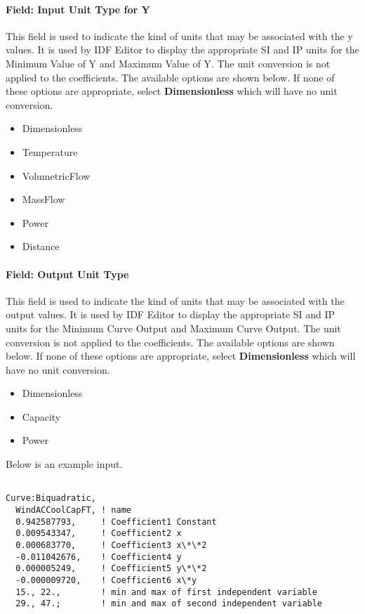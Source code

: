 \paragraph{Field: Input Unit Type for Y}\label{field-input-unit-type-for-y-2}

This field is used to indicate the kind of units that may be associated with the y values. It is used by IDF Editor to display the appropriate SI and IP units for the Minimum Value of Y and Maximum Value of Y. The unit conversion is not applied to the coefficients. The available options are shown below. If none of these options are appropriate, select \textbf{Dimensionless} which will have no unit conversion.

\begin{itemize}
\item
  Dimensionless
\item
  Temperature
\item
  VolumetricFlow
\item
  MassFlow
\item
  Power
\item
  Distance
\end{itemize}

\paragraph{Field: Output Unit Type}\label{field-output-unit-type-6}

This field is used to indicate the kind of units that may be associated with the output values. It is used by IDF Editor to display the appropriate SI and IP units for the Minimum Curve Output and Maximum Curve Output. The unit conversion is not applied to the coefficients. The available options are shown below. If none of these options are appropriate, select \textbf{Dimensionless} which will have no unit conversion.

\begin{itemize}
\item
  Dimensionless
\item
  Capacity
\item
  Power
\end{itemize}

Below is an example input.

\begin{lstlisting}

Curve:Biquadratic,
  WindACCoolCapFT, ! name
  0.942587793,     ! Coefficient1 Constant
  0.009543347,     ! Coefficient2 x
  0.000683770,     ! Coefficient3 x\*\*2
  -0.011042676,    ! Coefficient4 y
  0.000005249,     ! Coefficient5 y\*\*2
  -0.000009720,    ! Coefficient6 x\*y
  15., 22.,        ! min and max of first independent variable
  29., 47.;        ! min and max of second independent variable
\end{lstlisting}


